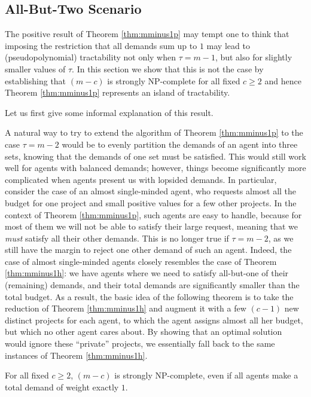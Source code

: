 \documentclass{article}
\begin{document}
\subsection{All-But-Two Scenario}

The positive result of Theorem \ref{thm:mminus1p} may tempt one to think that imposing the restriction that all demands sum up to $1$ may lead to (pseudopolynomial) tractability not only when $\tau=m-1$, but also for slightly smaller values of $\tau$. In this section we show that this is not the case by establishing that \AAS$(m-c)$ is strongly NP-complete for all fixed $c\ge 2$ and hence Theorem \ref{thm:mminus1p} represents an island of tractability. 

Let us first give some informal explanation of this result.

A natural way to try to extend the algorithm of Theorem \ref{thm:mminus1p} to the case $\tau=m-2$ would be to evenly partition the demands of an agent into three sets, knowing that the demands of one set must be satisfied. This would still work well for agents with balanced demands; however, things become significantly more complicated when agents present us with lopsided demands. In particular, consider the case of an almost single-minded agent, who requests almost all the budget for one project and small positive values for a few other projects. In the context of Theorem \ref{thm:mminus1p}, such agents are easy to handle, because for most of them we will not be able to satisfy their large request, meaning that we \emph{must} satisfy all their other demands. This is no longer true if $\tau=m-2$, as we still have the margin to reject one other demand of such an agent. Indeed, the case of almost single-minded agents closely resembles the case of Theorem \ref{thm:mminus1h}: we have agents where we need to satisfy all-but-one of their (remaining) demands, and their total demands are significantly smaller than the total budget. As a result, the basic idea of the following theorem is to take the reduction of Theorem \ref{thm:mminus1h} and augment it with a few $(c-1)$ new distinct projects for each agent, to which the agent assigns almost all her budget, but which no other agent cares about. By showing that an optimal solution would ignore these ``private'' projects, we essentially fall back to the same instances of Theorem \ref{thm:mminus1h}.


\begin{theorem}\label{thm:mminus2} 
For all fixed $c\ge 2$, \AAS$(m-c)$ is strongly NP-complete, even if all agents make a total demand of weight exactly $1$.
\end{theorem}
\end{document}
